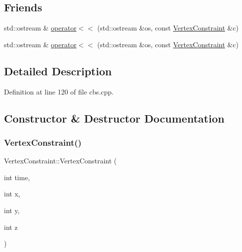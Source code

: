 \subsection*{Friends}
\begin{DoxyCompactItemize}
\item 
std\+::ostream \& \hyperlink{struct_vertex_constraint_a673f5d8fdc4898875720dddfd6c80e68}{operator$<$$<$} (std\+::ostream \&os, const \hyperlink{struct_vertex_constraint}{Vertex\+Constraint} \&c)
\item 
std\+::ostream \& \hyperlink{struct_vertex_constraint_a673f5d8fdc4898875720dddfd6c80e68}{operator$<$$<$} (std\+::ostream \&os, const \hyperlink{struct_vertex_constraint}{Vertex\+Constraint} \&c)
\end{DoxyCompactItemize}


\subsection{Detailed Description}


Definition at line 120 of file cbs.\+cpp.



\subsection{Constructor \& Destructor Documentation}
\mbox{\label{struct_vertex_constraint_a9916de476d15970c6be19739d89b8ff3}} 
\subsubsection{\texorpdfstring{Vertex\+Constraint()}{VertexConstraint()}\hspace{0.1cm}{\footnotesize\ttfamily [1/2]}}
{\footnotesize\ttfamily Vertex\+Constraint\+::\+Vertex\+Constraint (\begin{DoxyParamCaption}\item[{int}]{time,  }\item[{int}]{x,  }\item[{int}]{y,  }\item[{int}]{z }\end{DoxyParamCaption})\hspace{0.3cm}{\ttfamily [inline]}}




